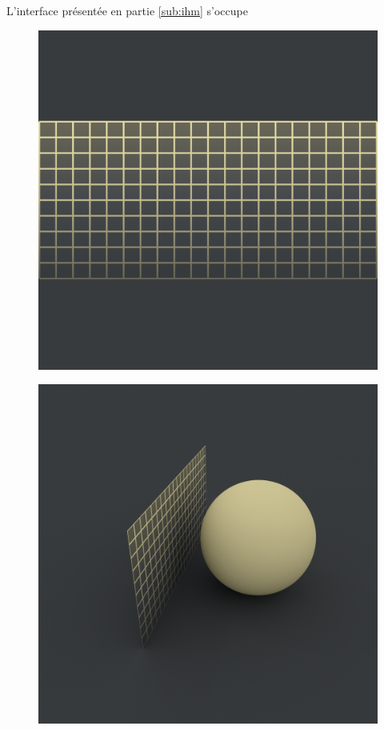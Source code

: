 		
		L'interface présentée en partie \ref{sub:ihm} s'occupe
		\begin{figure}[H]
			\centering
			\begin{minipage}{.5\textwidth}
				\centering
				\includegraphics[width=0.95\linewidth]{figures/def0.png}
				\label{fig:def0}
			\end{minipage}%
			\begin{minipage}{.5\textwidth}
				\centering
				\includegraphics[width=0.95\linewidth]{figures/def1.png}
				\label{fig:def1}
			\end{minipage}
			

\end{figure}
